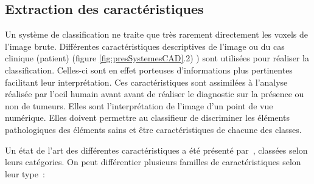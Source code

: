 	\subsection{Extraction des caractéristiques}

Un système de classification ne traite que très rarement directement les voxels de l’image brute. Différentes caractéristiques descriptives de l’image ou du cas clinique (patient) (figure \ref{fig:presSystemesCAD}.2) ) sont utilisées pour réaliser la classification. Celles-ci sont en effet porteuses d’informations plus pertinentes facilitant leur interprétation. Ces caractéristiques sont assimilées à l'analyse réalisée par l'oeil humain avant avant de réaliser le diagnostic sur la présence ou non de tumeurs. Elles sont l’interprétation de l’image d’un point de vue numérique. Elles doivent permettre au classifieur de discriminer les éléments pathologiques des éléments sains et être caractéristiques de chacune des classes. 

Un état de l'art des différentes caractéristiques a été présenté par~\cite{cheng2006approaches}, classées selon leurs catégories. On peut différentier plusieurs familles de caractéristiques selon leur type :

